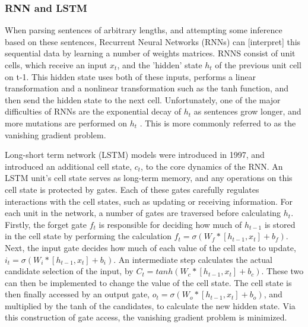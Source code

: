 \subsubsection{RNN and LSTM}
When parsing sentences of arbitrary lengths, and attempting some inference based
on these sentences, Recurrent Neural Networks (RNNs) can [interpret] this
sequential data by learning a number of weights matrices. RNNS consist of unit
cells, which receive an input $x_t$, and the 'hidden' state $h_t$ of the
previous unit cell on t-1. This hidden state uses both of these inputs, performs
a linear transformation and a nonlinear transformation such as the tanh
function, and then send the hidden state to the next cell. Unfortunately, one of
the major difficulties of RNNs are the exponential decay of $h_t$ as
sentences grow {longer}, and more mutations are performed on $h_t$
\cite{bengio1994learning}. This is more commonly referred to as the vanishing 
gradient problem.

Long-short term network (LSTM) models \cite{hochreiter1997long} were introduced
in 1997, and introduced an additional cell state, $c_t$, to the core dynamics of
the RNN. An LSTM unit's cell state serves as long-term memory, and any
operations on this cell state is protected by gates. Each of these gates
carefully regulates interactions with the cell states, such as updating or
receiving information. For each unit in the network, a number of gates are
traversed before calculating $h_t$. Firstly, the forget gate $f_t$ is
responsible for deciding how much of $h_{t-1}$ is stored in the cell state by
performing the calculation $f_t = \sigma(W_f * [h_{t-1}, x_t] + b_f)$. Next, the
input gate decides how much of each value of the cell state to update, $i_t =
\sigma(W_i * [h_{t-1}, x_t] + b_i)$. An intermediate step calculates the actual
candidate selection of the input, by $C_t = tanh(W_c * [h_{t-1}, x_t] + b_c)$.
These two can then be implemented to change the value of the cell state. The
cell state is then finally accessed by an output gate, $o_t = \sigma(W_o *
[h_{t-1}, x_t] + b_o)$, and multiplied by the tanh of the candidates, to
calculate the new hidden state. Via this construction of gate access, the
vanishing gradient problem is minimized.
